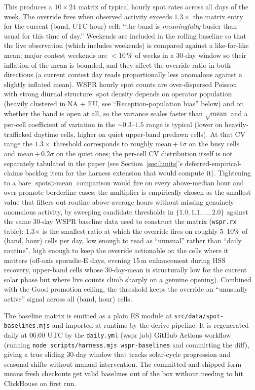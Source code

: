 \documentclass[11pt,a4paper]{article}
\begin{document}
This produces a $10 \times 24$ matrix of typical hourly spot rates
across all days of the week.  The override fires when observed
activity exceeds $1.3 \times$ the matrix entry for the current
(band, UTC-hour) cell: ``the band is \emph{meaningfully}
busier than usual for this time of day.''  Weekends are included
in the rolling baseline so that the live observation (which
includes weekends) is compared against a like-for-like mean;
major contest weekends are $<\!10\,\%$ of weeks in a 30-day
window so their inflation of the mean is bounded, and they
affect the override ratio in both directions (a current contest
day reads proportionally less anomalous against a slightly
inflated mean).  WSPR
hourly spot counts are over-dispersed Poisson with strong diurnal
structure: spot density depends on operator population (heavily
clustered in NA + EU, see ``Reception-population bias'' below)
and on whether the band is open at all, so the variance scales
faster than $\sqrt{\text{mean}}$ and a per-cell coefficient of
variation in the ${\sim}0.3$--$1.5$ range is typical (lower on
heavily-trafficked daytime cells, higher on quiet upper-band
predawn cells).  At that CV range the $1.3\times$ threshold
corresponds to roughly mean\,+\,$1\sigma$ on the busy cells and
mean\,+\,$0.2\sigma$ on the quiet ones; the per-cell CV
distribution itself is not separately tabulated in the paper
(see Section~\ref{sec:limits}'s deferred-empirical-claims
backlog item for the harness extension that would compute it).  Tightening to a bare $\text{spots} > \text{mean}$
comparison would fire on every above-median hour and over-promote
borderline cases; the multiplier is empirically chosen as the
smallest value that filters out routine above-average hours
without missing genuinely anomalous activity, by
sweeping candidate thresholds in $\{1.0, 1.1, \ldots, 2.0\}$
against the same 30-day WSPR baseline data used to construct the
matrix (\texttt{wspr.rx} table): 1.3$\times$ is
the smallest ratio at which the override fires on roughly 5--10\%
of (band, hour) cells per day, low enough to read as
``unusual'' rather than ``daily routine'', high enough to keep
the override actionable on the cells where it matters (off-axis
sporadic-E days, evening 15\,m enhancement during HSS recovery,
upper-band cells whose 30-day-mean is structurally low for the
current solar phase but where live counts climb sharply on a
genuine opening).  Combined with the Good promotion
ceiling, the threshold keeps the override an ``unusually active''
signal across all (band, hour) cells.

The baseline matrix is emitted as a plain ES module at
\texttt{src/data/spot-baselines.mjs} and imported at runtime by
the derive pipeline.  It is regenerated daily at 06:00 UTC by
the \texttt{daily.yml} (wspr job) GitHub Actions workflow (running
\texttt{node scripts/harness.mjs wspr-baselines} and committing
the diff), giving a true sliding 30-day window that tracks
solar-cycle progression and seasonal shifts without manual
intervention.  The committed-and-shipped form means fresh
checkouts get valid baselines out of the box without needing to
hit ClickHouse on first run.
\end{document}
